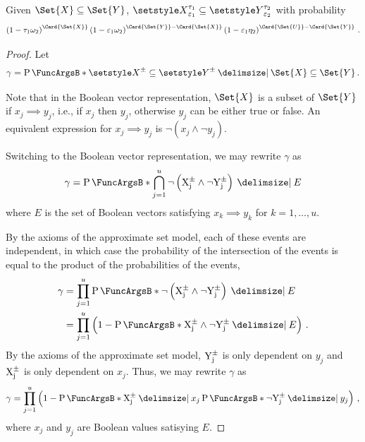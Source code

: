 \documentclass[10pt,final,hidelinks]{article}
\numberwithin{equation}{section}
\begin{document}
\begin{theorem}
Given $\Set{X} \subseteq \Set{Y}$, $\ASet{X}[\fprate_1][\tprate_1] \subseteq \ASet{Y}[\fprate_2][\tprate_2]$ with probability
\begin{equation}
	\left(1 - \tprate_1\fnrate_2\right)^{\Card{\Set{X}}}
	\left(1 - \fprate_1\fnrate_2\right)^{\Card{\Set{Y}} - \Card{\Set{X}}}
	\left(1 - \fprate_1\tnrate_2\right)^{\Card{\Set{U}} - \Card{\Set{Y}}}\,.
\end{equation}
\end{theorem}
\begin{proof}
	Let
	\begin{equation}
	\gamma = \Prob{\ASet{X} \subseteq \ASet{Y} \Given \Set{X} \subseteq 
		\Set{Y}}\,.
	\end{equation}
	
	Note that in the Boolean vector representation, $\Set{X}$ is a subset of 
	$\Set{Y}$ if $x_j \implies y_j$, i.e., if $x_j$ then $y_j$, otherwise $y_j$ can 
	be either true or false. An equivalent expression for $x_j \implies y_j$ is 
	$\neg (x_j \land \neg y_j)$.
	
	Switching to the Boolean vector representation, we may rewrite $\gamma$ as
	\begin{equation}
	\gamma = \Prob{\bigcap_{j=1}^{u} \neg \left(\AVecComp{X}[j] \land \neg 
		\AVecComp{Y}[j]\right) \Given E}
	\end{equation}
	where $E$ is the set of Boolean vectors satisfying $x_k \implies y_k$ for     
	$k=1,\ldots,u$.
	
	By the axioms of the approximate set model, each of these events are 
	independent, in which case the probability of the intersection of the events is 
	equal to the product of the probabilities of the events,
	\begin{align}
	\gamma
	&= \prod_{j=1}^{u} \Prob{\neg\left(\AVecComp{X}[j] 
		\land \neg \AVecComp{Y}[j]\right) \Given E}\\
	&= \prod_{j=1}^{u} \left(1 - \Prob{\AVecComp{X}[j] 
		\land \neg \AVecComp{Y}[j] \Given E}\right)\,.
	\end{align}
	By the axioms of the approximate set model, $\AVecComp{Y}[j]$ is only dependent 
	on $y_j$ and $\AVecComp{X}[j]$ is only dependent on $x_j$. Thus, we may rewrite 
	$\gamma$ as
	\begin{equation}
	\gamma = \prod_{j=1}^{u}\left(
	1 - \Prob{\AVecComp{X}[j] \Given x_j}
	\Prob{\neg \AVecComp{Y}[j] \Given y_j}\right)\,,
	\end{equation}
	where $x_j$ and $y_j$ are Boolean values satisying $E$.
	

\end{proof}
\end{document}
